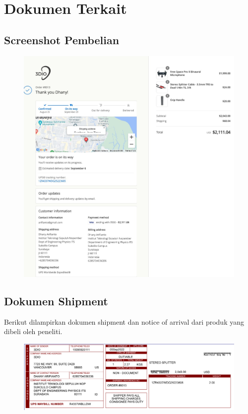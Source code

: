 \documentclass{article} %
\begin{document}
	\section{Dokumen Terkait}

	\subsection{Screenshot Pembelian}

	\begin{figure}[!ht]
		\centering
		\includegraphics[width=400pt]{images/pesan3DIO}
	\end{figure}

	\subsection{Dokumen Shipment}

	Berikut dilampirkan dokumen shipment dan notice of arrival dari produk yang dibeli oleh peneliti.

	
	

	\begin{figure}[!ht]
		\centering
		\includegraphics[width=400pt]{images/shipment}
	\end{figure}
\end{document}
